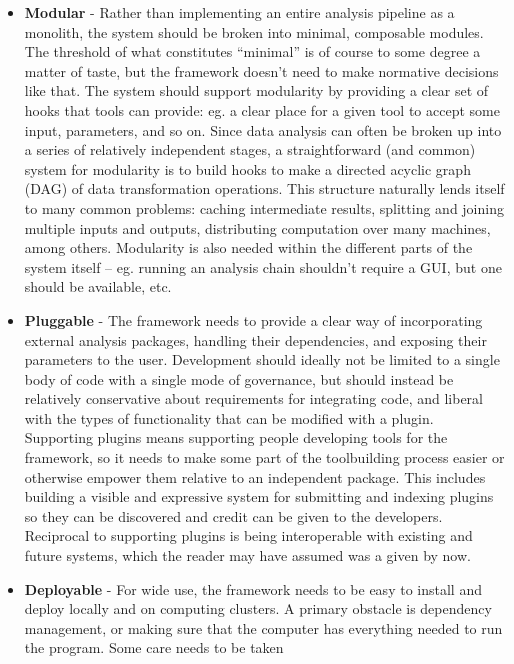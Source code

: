 \documentclass[notoc]{tufte-book}
\begin{document}
\begin{itemize}

\item
  \textbf{Modular} - Rather than implementing an entire analysis
  pipeline as a monolith, the system should be broken into minimal,
  composable modules. The threshold of what constitutes ``minimal'' is
  of course to some degree a matter of taste, but the framework doesn't
  need to make normative decisions like that. The system should support
  modularity by providing a clear set of hooks that tools can provide:
  eg. a clear place for a given tool to accept some input, parameters,
  and so on. Since data analysis can often be broken up into a series of
  relatively independent stages, a straightforward (and common) system
  for modularity is to build hooks to make a directed acyclic graph
  (DAG) of data transformation operations. This structure naturally
  lends itself to many common problems: caching intermediate results,
  splitting and joining multiple inputs and outputs, distributing
  computation over many machines, among others. Modularity is also
  needed within the different parts of the system itself -- eg. running
  an analysis chain shouldn't require a GUI, but one should be
  available, etc.
\item
  \textbf{Pluggable} - The framework needs to provide a clear way of
  incorporating external analysis packages, handling their dependencies,
  and exposing their parameters to the user. Development should ideally
  not be limited to a single body of code with a single mode of
  governance, but should instead be relatively conservative about
  requirements for integrating code, and liberal with the types of
  functionality that can be modified with a plugin. Supporting plugins
  means supporting people developing tools for the framework, so it
  needs to make some part of the toolbuilding process easier or
  otherwise empower them relative to an independent package. This
  includes building a visible and expressive system for submitting and
  indexing plugins so they can be discovered and credit can be given to
  the developers. Reciprocal to supporting plugins is being
  interoperable with existing and future systems, which the reader may
  have assumed was a given by now.
\item
  \textbf{Deployable} - For wide use, the framework needs to be easy to
  install and deploy locally and on computing clusters. A primary
  obstacle is dependency management, or making sure that the computer
  has everything needed to run the program. Some care needs to be taken

\end{itemize}
\end{document}
